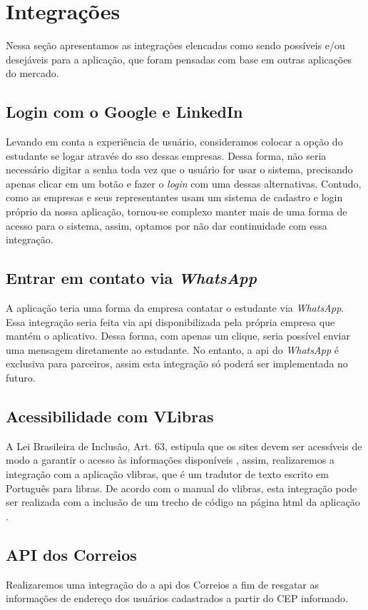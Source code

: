 \section{Integrações}
Nessa seção apresentamos as integrações elencadas como sendo possíveis e/ou desejáveis para a aplicação, que foram pensadas com base em outras aplicações do mercado.

\subsection{Login com o Google e LinkedIn}
Levando em conta a experiência de usuário, consideramos colocar a opção do estudante se logar através do \ac{sso} dessas empresas. Dessa forma, não seria necessário digitar a senha toda vez que o usuário for usar o sistema, precisando apenas clicar em um botão e fazer o \textit{login} com uma dessas alternativas. Contudo, como as empresas e seus representantes usam um sistema de cadastro e login próprio da nossa aplicação, tornou-se complexo manter mais de uma forma de acesso para o sistema, assim, optamos por não dar continuidade com essa integração.

\subsection{Entrar em contato via \textit{WhatsApp}}
A aplicação teria uma forma da empresa contatar o estudante via \textit{WhatsApp}. Essa integração seria feita via \ac{api} disponibilizada pela própria empresa que mantém o aplicativo. Dessa forma, com apenas um clique, seria possível enviar uma mensagem diretamente ao estudante. No entanto, a \ac{api} do \textit{WhatsApp} é exclusiva para parceiros, assim esta integração só poderá ser implementada no futuro.

\subsection{Acessibilidade com VLibras}
A Lei Brasileira de Inclusão, Art. 63, estipula que os sites devem ser acessíveis de modo a garantir o acesso às informações disponíveis \cite{leiinclusao}, assim, realizaremos a integração com a aplicação \gls{vlibras}, que é um tradutor de texto escrito em Português para \ac{libras}. De acordo com o manual do \gls{vlibras}, esta integração pode ser realizada com a inclusão de um trecho de código na página \ac{html} da aplicação \cite{manualvlibras}.

\subsection{API dos Correios}
Realizaremos uma integração do a \ac{api} dos Correios a fim de resgatar as informações de endereço dos usuários cadastrados a partir do CEP informado.